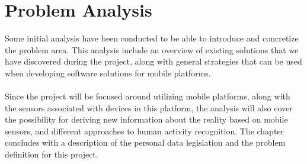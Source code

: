 
\chapter{Problem Analysis}
\label{cha:problem_analysis}

Some initial analysis have been conducted to be able to introduce and concretize the problem area. This analysis include an overview of existing solutions that we have discovered during the project, along with general strategies that can be used when developing software solutions for mobile platforms. 
\\\\
Since the project will be focused around utilizing mobile platforms, along with the sensors associated with devices in this platform, the analysis will also cover the possibility for deriving new information about the reality based on mobile sensors, and different approaches to human activity recognition. The chapter concludes with a description of the personal data legislation and the problem definition for this project.












